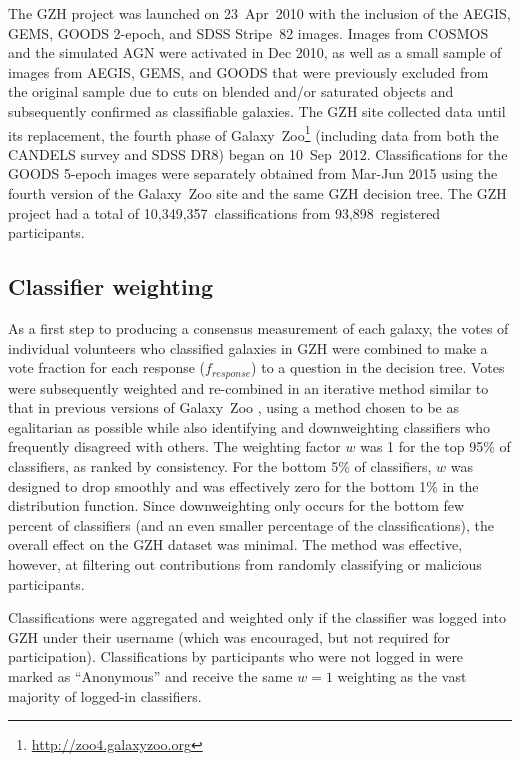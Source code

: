 \documentclass[twocolumn]{aastex6}
\begin{document}
The GZH project was launched on 23~Apr~2010 with the inclusion of the AEGIS,
GEMS, GOODS 2-epoch, and SDSS Stripe~82 images. Images from COSMOS and the
simulated AGN were activated in Dec 2010, as well as a small sample of images
from AEGIS, GEMS, and GOODS that were previously excluded from the original
sample due to cuts on blended and/or saturated objects and subsequently
confirmed as classifiable galaxies. The GZH site collected data until its
replacement, the fourth phase of
Galaxy~Zoo\footnote{\url{http://zoo4.galaxyzoo.org}} (including data from both
the \hst{} CANDELS survey and SDSS DR8) began on 10~Sep~2012. Classifications
for the GOODS 5-epoch images were separately obtained from Mar-Jun 2015 using
the fourth version of the Galaxy~Zoo site and the same GZH decision tree.
The GZH project had a total of 10,349,357~classifications from
93,898~registered participants. 


\subsection{Classifier weighting}\label{ssec:weighting}

As a first step to producing a consensus measurement of each galaxy, the votes
of individual volunteers who classified galaxies in GZH were combined to make a
vote fraction for each response ($f_{response}$) to a question in the decision
tree. Votes were subsequently weighted and re-combined in an iterative method
similar to that in previous versions of Galaxy~Zoo \citep{lan08,wil13}, using a
method chosen to be as egalitarian as possible while also identifying and
downweighting classifiers who frequently disagreed with others. The weighting
factor $w$ was 1 for the top 95\% of classifiers, as ranked by consistency.
For the bottom 5\% of classifiers, $w$ was designed to drop smoothly and was
effectively zero for the bottom 1\% in the distribution function. Since
downweighting only occurs for the bottom few percent of classifiers (and an even smaller
percentage of the classifications), the overall effect on the GZH dataset was
minimal. The method was effective, however, at filtering out contributions from
randomly classifying or malicious participants.

Classifications were aggregated and weighted only if the classifier was logged
into GZH under their username (which was encouraged, but not required for
participation). Classifications by participants who were not logged in were marked as
``Anonymous'' and receive the same $w=1$ weighting as the vast majority
of logged-in classifiers.
\end{document}
